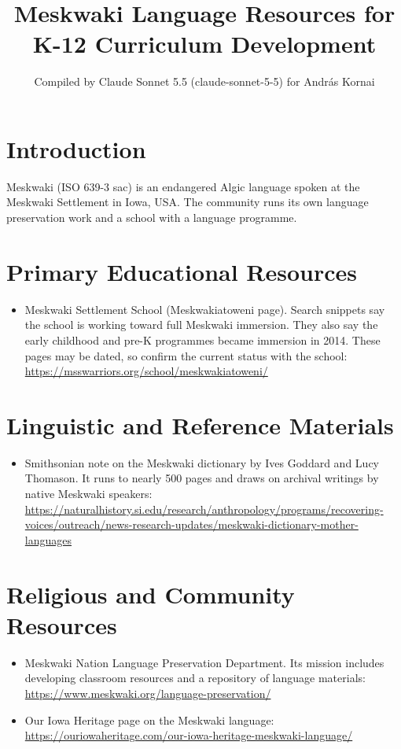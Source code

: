 \documentclass[12pt]{article}
\title{Meskwaki Language Resources for K-12 Curriculum Development}
\author{Compiled by Claude Sonnet 5.5 (claude-sonnet-5-5) for Andr\'as Kornai}
\date{}
\begin{document}
\maketitle

\section{Introduction}
Meskwaki (ISO 639-3 sac) is an endangered Algic language spoken at the Meskwaki Settlement in Iowa, USA. The community runs its own language preservation work and a school with a language programme.

\section{Primary Educational Resources}
\begin{itemize}
\item Meskwaki Settlement School (Meskwakiatoweni page). Search snippets say the school is working toward full Meskwaki immersion. They also say the early childhood and pre-K programmes became immersion in 2014. These pages may be dated, so confirm the current status with the school: \url{https://msswarriors.org/school/meskwakiatoweni/}
\end{itemize}

\section{Linguistic and Reference Materials}
\begin{itemize}
\item Smithsonian note on the Meskwaki dictionary by Ives Goddard and Lucy Thomason. It runs to nearly 500 pages and draws on archival writings by native Meskwaki speakers: \url{https://naturalhistory.si.edu/research/anthropology/programs/recovering-voices/outreach/news-research-updates/meskwaki-dictionary-mother-languages}
\end{itemize}

\section{Religious and Community Resources}
\begin{itemize}
\item Meskwaki Nation Language Preservation Department. Its mission includes developing classroom resources and a repository of language materials: \url{https://www.meskwaki.org/language-preservation/}
\item Our Iowa Heritage page on the Meskwaki language: \url{https://ouriowaheritage.com/our-iowa-heritage-meskwaki-language/}
\end{itemize}
\end{document}
